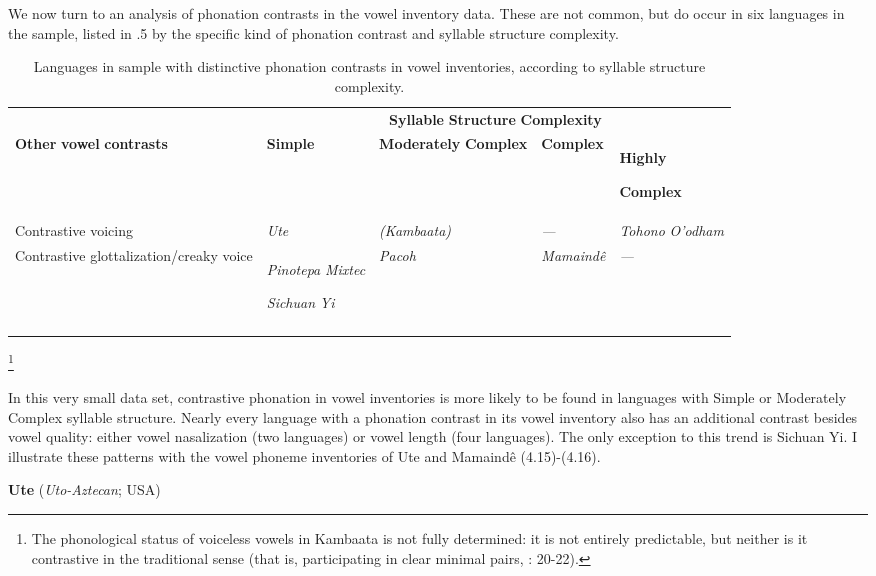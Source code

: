   We now turn to an analysis of phonation contrasts in the vowel inventory data. These are not common, but do occur in six languages in the sample, listed in .5 by the specific kind of phonation contrast and syllable structure complexity.






\begin{table}
\begin{tabularx}{\textwidth}{XXXXX}
 & \multicolumn{4}{c}{ \textbf{Syllable} \textbf{Structure} \textbf{Complexity}}\\
\lsptoprule
\textbf{Other} \textbf{vowel} \textbf{contrasts} & \textbf{Simple} & \textbf{Moderately} \textbf{Complex} & \textbf{Complex} & { \textbf{Highly} }

 \textbf{Complex}\\
Contrastive voicing & \textit{Ute} & \textit{(Kambaata)} & \textit{—} & \textit{Tohono} \textit{O’odham}\\
Contrastive glottalization/creaky voice & { \textit{Pinotepa} \textit{Mixtec}}

 \textit{Sichuan} \textit{Yi} & \textit{Pacoh} & \textit{Mamaindê} & \textit{—}\\
\lspbottomrule
\end{tabularx}
\caption{\label{4.5}Languages in sample with distinctive phonation contrasts in vowel inventories, according to syllable structure complexity.}
\footnote{ \textrm{The phonological status of voiceless vowels in Kambaata is not fully determined: it is not entirely predictable, but neither is it contrastive in the traditional sense (that is, participating in clear minimal pairs, \citealt{Treis2008}: 20-22).}}
\end{table}




  In this very small data set, contrastive phonation in vowel inventories is more likely to be found in languages with Simple or Moderately Complex syllable structure. Nearly every language with a phonation contrast in its vowel inventory also has an additional contrast besides vowel quality: either vowel nasalization (two languages) or vowel length (four languages). The only exception to this trend is Sichuan Yi. I illustrate these patterns with the vowel phoneme inventories of Ute and Mamaindê (4.15)-(4.16).



\ea\label{ex:(4.15)}
  \textbf{Ute} (\textit{Uto-Aztecan}; USA)



